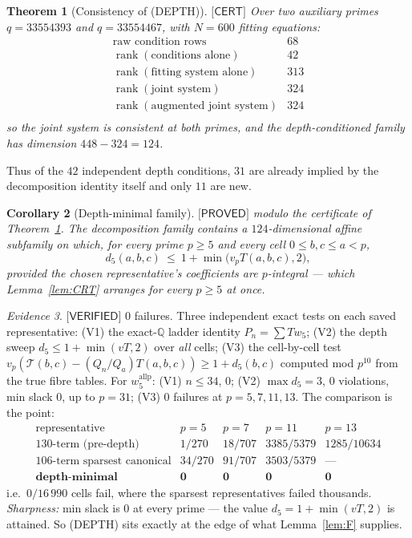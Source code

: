 \documentclass[11pt,reqno]{amsart}
\theoremstyle{plain}
\newtheorem{theorem}{Theorem}[section]
\newtheorem{corollary}[theorem]{Corollary}
\theoremstyle{definition}
\theoremstyle{remark}
\newtheorem{evidence}[theorem]{Evidence}
\numberwithin{equation}{section}
\newcommand{\QQ}{\mathbb{Q}}
\newcommand{\rank}{\operatorname{rank}}
\newcommand{\Tcal}{\mathcal{T}}
\newcommand{\wfive}{w_5}
\newcommand{\PROVED}{\textsf{[PROVED]}}
\newcommand{\VERIFIED}{\textsf{[VERIFIED]}}
\newcommand{\CERT}{\textsf{[CERT]}}
\begin{document}
\begin{theorem}[Consistency of (DEPTH)]\label{thm:depthcons}
$\CERT$ Over two auxiliary primes $q=33554393$ and $q=33554467$, with $N=600$ fitting
equations:
\[
\begin{array}{ll}
\text{raw condition rows}&68\\
\rank(\text{conditions alone})&42\\
\rank(\text{fitting system alone})&313\\
\rank(\text{joint system})&324\\
\rank(\text{augmented joint system})&324\\
\end{array}
\]
so the joint system is \emph{consistent} at both primes, and the depth-conditioned family has
dimension $448-324=124$.
\end{theorem}

Thus of the $42$ independent depth conditions, $31$ are already implied by the decomposition
identity itself and only $11$ are new.

\begin{corollary}[Depth-minimal family]\label{cor:W5DEPTH}
$\PROVED$ modulo the certificate of Theorem~\textup{\ref{thm:depthcons}}. The decomposition
family contains a $124$-dimensional affine subfamily on which, for \emph{every} prime $p\ge5$
and every cell $0\le b,c\le a<p$,
\[
d_5(a,b,c)\ \le\ 1+\min\bigl(v_pT(a,b,c),2\bigr),
\]
provided the chosen representative's coefficients are $p$-integral --- which
Lemma~\textup{\ref{lem:CRT}} arranges for every $p\ge5$ at once.
\end{corollary}

\begin{evidence}\label{ev:depth}
$\VERIFIED$ $0$ failures. Three independent exact tests on each saved representative:
(V1) the exact-$\QQ$ ladder identity $P_n=\sum T\wfive$; (V2) the depth sweep
$d_5\le1+\min(vT,2)$ over \emph{all} cells; (V3) the cell-by-cell test
$v_p(\Tcal(b,c)-(Q_n/Q_a)T(a,b,c))\ge1+d_5(b,c)$ computed mod $p^{10}$ from the true fibre
tables. For $w_5^{\mathrm{allp}}$: (V1) $n\le34$, $0$; (V2) $\max d_5=3$, $0$ violations, min
slack $0$, up to $p=31$; (V3) $0$ failures at $p=5,7,11,13$. The comparison is the point:
\[
\begin{array}{lcccc}
\text{representative} & p=5 & p=7 & p=11 & p=13\\\hline
\text{130-term (pre-depth)} & 1/270 & 18/707 & 3385/5379 & 1285/10634\\
\text{106-term sparsest canonical} & 34/270 & 91/707 & 3503/5379 & \text{---}\\
\textbf{depth-minimal} & \mathbf 0 & \mathbf 0 & \mathbf 0 & \mathbf 0
\end{array}
\]
i.e.\ $0/16\,990$ cells fail, where the sparsest representatives failed thousands.
\emph{Sharpness:} min slack is $0$ at every prime --- the value $d_5=1+\min(vT,2)$ is attained.
So (DEPTH) sits exactly at the edge of what Lemma~\ref{lem:F} supplies.
\end{evidence}
\end{document}

